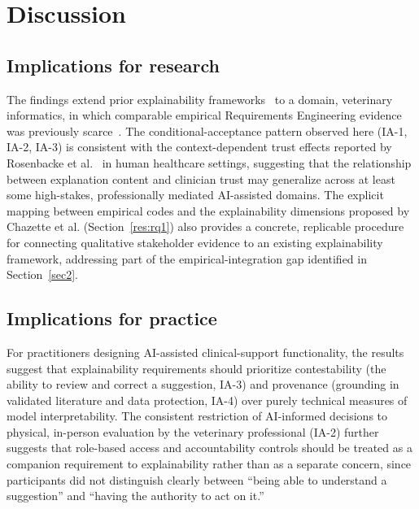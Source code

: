 \documentclass[pdflatex,sn-mathphys-num,Numbered]{sn-jnl}
\begin{document}

\section{Discussion}\label{sec5}

\subsection{Implications for research}\label{disc:research}

The findings extend prior explainability frameworks~\cite{chazette2020,chazette2021,chazette2022} to a domain, veterinary informatics, in which comparable empirical Requirements Engineering evidence was previously scarce~\cite{lustgarten2020}. The conditional-acceptance pattern observed here (IA-1, IA-2, IA-3) is consistent with the context-dependent trust effects reported by Rosenbacke et al.~\cite{rosenbacke2024} in human healthcare settings, suggesting that the relationship between explanation content and clinician trust may generalize across at least some high-stakes, professionally mediated AI-assisted domains. The explicit mapping between empirical codes and the explainability dimensions proposed by Chazette et al. (Section~\ref{res:rq1}) also provides a concrete, replicable procedure for connecting qualitative stakeholder evidence to an existing explainability framework, addressing part of the empirical-integration gap identified in Section~\ref{sec2}.

\subsection{Implications for practice}\label{disc:practice}

For practitioners designing AI-assisted clinical-support functionality, the results suggest that explainability requirements should prioritize contestability (the ability to review and correct a suggestion, IA-3) and provenance (grounding in validated literature and data protection, IA-4) over purely technical measures of model interpretability. The consistent restriction of AI-informed decisions to physical, in-person evaluation by the veterinary professional (IA-2) further suggests that role-based access and accountability controls should be treated as a companion requirement to explainability rather than as a separate concern, since participants did not distinguish clearly between ``being able to understand a suggestion'' and ``having the authority to act on it.''
\end{document}
